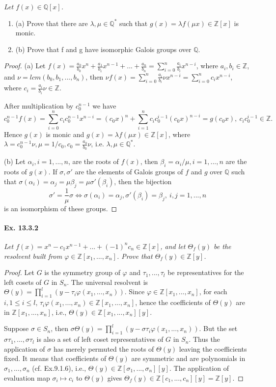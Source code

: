 \documentclass[11pt,a4paper]{article}
\newcommand{\be} {\begin{enumerate}}
\newcommand{\ee} {\end{enumerate}}
\newcommand{\Q}{\mathbb{Q}}
\newcommand{\Z}{\mathbb{Z}}
\begin{document}
{\it Let $f(x) \in \Q[x]$.
\be
\item[(a)] Prove that there are $\lambda, \mu \in \Q^*$ such that $g(x)=\lambda f(\mu x)\in\Z[x]$ is monic.
\item[(b)] Prove that f and g have isomorphic Galois groups over $\Q$.
\ee
\begin{proof}
\item[(a)] Let $f(x)=\frac {a_0}{b_0}x^n+\frac {a_1}{b_1}x^{n-1}+...+\frac {a_n}{b_n}=\sum_{i=0}^n \frac {a_i}{b_i}x^{n-i}$, where $a_i,b_i \in \Z$, and $\nu=lcm(b_0,b_1,...,b_n)$, then $\nu f(x)=\sum_{i=0}^n \frac {a_i}{b_i}\nu x^{n-i}=\sum_{i=0}^n c_i x^{n-i}$, where $c_i=\frac {a_i}{b_i}\nu \in \Z$.

After multiplication by $c_0^{n-1}$ we have $$c_0^{n-1}f(x)=\sum_{i=0}^n c_i c_0^{n-1} x^{n-i}=(c_0 x)^n+\sum_{i=1}^n c_i c_0^{i-1} (c_0 x)^{n-i}=g(c_0 x), ~ c_i c_0^{i-1} \in \Z.$$ Hence $g(x)$ is monic   and $g(x)=\lambda f(\mu x)\in\Z[x]$, where $\lambda=c_0^{n-1}\nu,\mu=1/c_0, c_0=\frac{a_0}{b_0} \nu$, i.e. $\lambda,\mu \in \Q^*$.

\item[(b)] Let $\alpha_i, i=1,...,n$, are the roots of $f(x)$, then $\beta_i=\alpha_i/\mu, i=1,...,n$ are the roots of $g(x)$. If $\sigma,\sigma'$ are the elements of Galois groups of $f$ and $g$ over $\Q$ such that $\sigma(\alpha_i)=\alpha_j=\mu\beta_j=\mu\sigma'(\beta_i)$, then the bijection $$\sigma'=\frac{1}{\mu}\sigma \iff  \sigma(\alpha_i)=\alpha_j,\sigma'(\beta_i)=\beta_j,~i,j=1,...,n $$  is an isomorphism of these groups.  
\end{proof}
}

\paragraph{Ex. 13.3.2}

{\it Let $f(x)=x^n-c_1x^{n-1}+...+(-1)^n c_n \in \Z[x]$, and let $\Theta_f(y)$ be the resolvent built from $\varphi \in \Z [x_1,...,x_n]$. Prove that $\Theta_f(y) \in \Z[y]$.

\begin{proof}
Let $G$ is the symmetry group of $\varphi$ and $\tau_1,...,\tau_l$ be representatives for the left cosets of $G$ in $S_n$. The universal resolvent is $\Theta(y)=\prod_{i=1}^l ( y - \tau_i\varphi(x_1,...,x_n))$. Since $\varphi \in \Z [x_1,...,x_n]$, for each $i, 1\leq i \leq l$, $\tau_i\varphi(x_1,...,x_n)\in \Z [x_1,...,x_n]  $, hence the coefficients of $\Theta(y)$ are in $\Z [x_1,...,x_n]  $, i.e., $\Theta(y)\in \Z [x_1,...,x_n][y]  $.

Suppose $\sigma \in S_n$, then $\sigma\Theta(y)=\prod_{i=1}^l ( y - \sigma\tau_i\varphi(x_1,...,x_n))$. But the set $\sigma\tau_1,...,\sigma\tau_l$ is also a set of left coset representatives of $G$ in $S_n$. Thus the application of $\sigma$ has merely permuted the roots of $\Theta(y)$ leaving the coefficients fixed. It means that coefficients of $\Theta(y)$ are symmetric and are polynomials in $\sigma_1,...,\sigma_n$ (cf. Ex.9.1.6), i.e., $\Theta(y)\in \Z [\sigma_1,...,\sigma_n][y]  $.
The application of evaluation map $\sigma_i \mapsto c_i$ to $\Theta(y)$ gives $\Theta_f(y) \in \Z [c_1,...,c_n][y] = \Z[y]$.
\end{proof}
}
\end{document}
